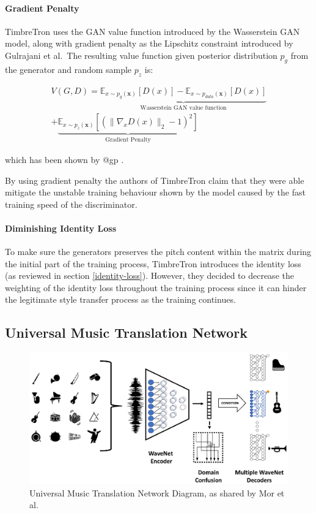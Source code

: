 \documentclass[12pt,a4paper,]{report}
\begin{document}
\paragraph{Gradient Penalty}

TimbreTron uses the GAN value function introduced by the Wasserstein GAN
model, along with gradient penalty as the Lipschitz constraint
introduced by Gulrajani et al.~The resulting value function given
posterior distribution \(p_g\) from the generator and random sample
\(p_z\) is:

\begin{multline}
    V(G, D) = \underbrace{
        \mathbb{E}_{x \sim p_{g}(\mathbf{x})} [D(x)] - \mathbb{E}_{x \sim p_{data}(\mathbf{x})} [D(x)]
        }_\textrm{Wasserstein GAN value function} \\ +
        \underbrace{
            \mathbb{E}_{x \sim p_z(\mathbf{x})} [(\| \nabla_x D(x) \|_2 - 1)^2]
        }_\textrm{Gradient Penalty} 
\end{multline}

which has been shown by @gp .

By using gradient penalty the authors of TimbreTron claim that they were
able mitigate the unstable training behaviour shown by the model caused
by the fast training speed of the discriminator.

\paragraph{Diminishing Identity Loss}

To make sure the generators preserves the pitch content within the
matrix during the initial part of the training process, TimbreTron
introduces the identity loss (as reviewed in section
\ref{identity-loss}). However, they decided to decrease the weighting of
the identity loss throughout the training process since it can hinder
the legitimate style transfer process as the training continues.

\hypertarget{universal-music-translation-network}{%
\subsection{Universal Music Translation
Network}\label{universal-music-translation-network}}

\begin{figure}[h]
    \includegraphics[width=\textwidth]{figures/facebook_umtn.eps}
    \centering
    \caption{Universal Music Translation Network Diagram, as shared by Mor et al. \label{fig:facebook_umtn}}
\end{figure}
\end{document}
